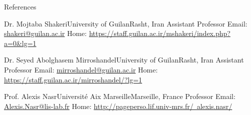 \documentclass[]{mcdowellcv}
\begin{document}
	 \begin{cvsection}{References}
	 
 		\begin{cvsubsection}{Dr. Mojtaba Shakeri}{University of Guilan}{Rasht, Iran}
		    Assistant Professor \newline
			Email: \href{mailto:shakeri@guilan.ac.ir}{shakeri@guilan.ac.ir} \newline
			Home: \href{https://staff.guilan.ac.ir/mshakeri/index.php?a=0\&lg=1}{https://staff.guilan.ac.ir/mshakeri/index.php?a=0\&lg=1}
    	\end{cvsubsection}
		
		\begin{cvsubsection}{Dr. Seyed Abolghasem Mirroshandel}{University of Guilan}{Rasht, Iran}
		    Assistant Professor \newline
			Email: \href{mailto:mirroshandel@guilan.ac.ir}{mirroshandel@guilan.ac.ir} \newline
			Home: \href{https://staff.guilan.ac.ir/mirroshandel/?lg=1}{https://staff.guilan.ac.ir/mirroshandel/?lg=1}

    	\end{cvsubsection}
    	
		\begin{cvsubsection}{Prof. Alexis Nasr}{Université Aix Marseille}{Marseille, France}
		    Professor \newline
			Email: \href{mailto:Alexis.Nasr@lis-lab.fr}{Alexis.Nasr@lis-lab.fr} \newline
			Home: \href{http://pageperso.lif.univ-mrs.fr/~alexis.nasr/}{http://pageperso.lif.univ-mrs.fr/~alexis.nasr/}
    	\end{cvsubsection}
    	


    \end{cvsection}
	
\end{document}
